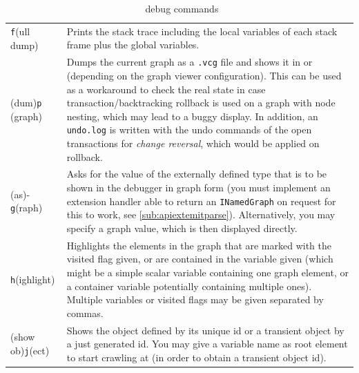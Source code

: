 \begin{table}[htbp]
\begin{tabularx}{\linewidth}{|lX|}
  \texttt{f}(ull dump) & Prints the stack trace including the local variables of each stack frame plus the global variables.\\
  (dum)\texttt{p} (graph)\label{dumpgraph} & Dumps the current graph as a \texttt{.vcg} file and shows it in \yComp{} or \extMSAGLExt{} (depending on the graph viewer configuration). 
    This can be used as a workaround to check the real state in case transaction/backtracking rollback is used on a graph with node nesting, which may lead to a buggy display.
    In addition, an \texttt{undo.log} is written with the undo commands of the open transactions for \emph{change reversal}, which would be applied on rollback.\\
  (as)-\texttt{g}(raph) & Asks for the value of the externally defined type that is to be shown in the debugger in graph form 
    (you must implement an extension handler able to return an \texttt{INamedGraph} on request for this to work, see \ref{sub:apiextemitparse}). 
    Alternatively, you may specify a graph value, which is then displayed directly.\\
  \texttt{h}(ighlight)\label{highlight} & Highlights the elements in the graph that are marked with the visited flag given, or are contained in the variable given (which might be a simple scalar variable containing one graph element, or a container variable potentially containing multiple ones). 
     Multiple variables or visited flags may be given separated by commas.\\
  (show ob)\texttt{j}(ect)\label{showobject} & Shows the object defined by its unique id or a transient object by a just generated id. You may give a variable name as root element to start crawling at (in order to obtain a transient object id).\\
\hline
  \end{tabularx}
  \caption{\GrShell\ debug commands}
  \label{tabdebug}
\end{table}


